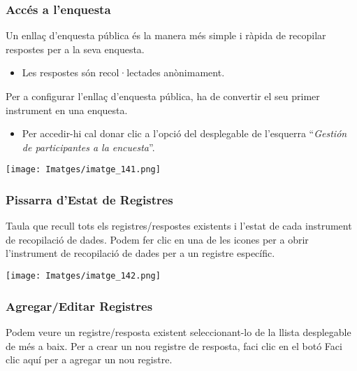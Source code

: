 \documentclass[
]{article}
\providecommand{\tightlist}{%
  \setlength{\itemsep}{0pt}\setlength{\parskip}{0pt}}
\begin{document}
\hypertarget{accuxe9s-a-lenquesta}{%
\subsubsection{\texorpdfstring{\textbf{Accés a l'enquesta}}{Accés a l'enquesta}}\label{accuxe9s-a-lenquesta}}

Un enllaç d'enquesta pública és la manera més simple i ràpida de recopilar respostes per a la seva enquesta.

\begin{itemize}
\tightlist
\item
  Les respostes són recol·lectades anònimament.
\end{itemize}

Per a configurar l'enllaç d'enquesta pública, ha de convertir el seu primer instrument en una enquesta.

\begin{itemize}
\tightlist
\item
  Per accedir-hi cal donar clic a l'opció del desplegable de l'esquerra ``\emph{Gestión de participantes a la encuesta}''.
\end{itemize}

\texttt{[image: Imatges/imatge\_141.png]}

\hypertarget{pissarra-destat-de-registres}{%
\subsubsection{\texorpdfstring{\textbf{Pissarra d'Estat de Registres}}{Pissarra d'Estat de Registres}}\label{pissarra-destat-de-registres}}

Taula que recull tots els registres/respostes existents i l'estat de cada instrument de recopilació de dades. Podem fer clic en una de les icones per a obrir l'instrument de recopilació de dades per a un registre específic.

\texttt{[image: Imatges/imatge\_142.png]}

\hypertarget{agregareditar-registres}{%
\subsubsection{\texorpdfstring{\textbf{Agregar/Editar Registres}}{Agregar/Editar Registres}}\label{agregareditar-registres}}

Podem veure un registre/resposta existent seleccionant-lo de la llista desplegable de més a baix. Per a crear un nou registre de resposta, faci clic en el botó Faci clic aquí per a agregar un nou registre.
\end{document}
